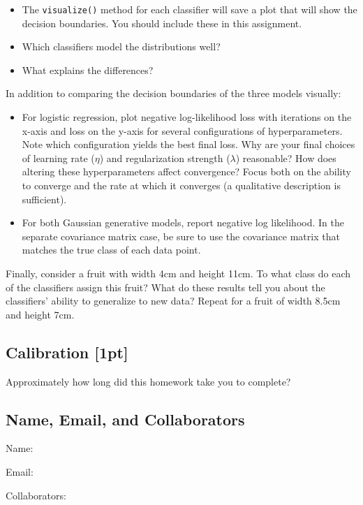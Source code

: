 \documentclass[submit]{harvardml}
\begin{document}
\begin{problem}
\begin{itemize}
\item The \texttt{visualize()} method for each classifier will save a plot that will show the decision boundaries. You should include these in this assignment.
\item Which classifiers model the distributions well?
\item What explains the differences?

\end{itemize}

In addition to comparing the decision boundaries of the three models visually:
\begin{itemize}

\item For logistic regression, plot negative log-likelihood loss with iterations on the x-axis and loss on the y-axis for several configurations of hyperparameters. Note which configuration yields the best final loss. Why are your final choices of learning rate ($\eta$) and regularization strength ($\lambda$) reasonable? How does altering these hyperparameters affect convergence? Focus both on the ability to converge and the rate at which it converges (a qualitative description is sufficient).

\item For both Gaussian generative models, report negative log likelihood. In the separate covariance matrix case, be sure to use the covariance matrix that matches the true class of each data point.

\end{itemize}

Finally, consider a fruit with width 4cm and height 11cm.  To what
class do each of the classifiers assign this fruit? What do these results tell you about the classifiers' ability to generalize to new data?  Repeat
for a fruit of width 8.5cm and height 7cm.

\end{problem}

\newpage
\subsection*{Calibration [1pt]}
Approximately how long did this homework take you to complete?

\subsection*{Name, Email, and Collaborators}

Name:

Email:

Collaborators:
\end{document}
